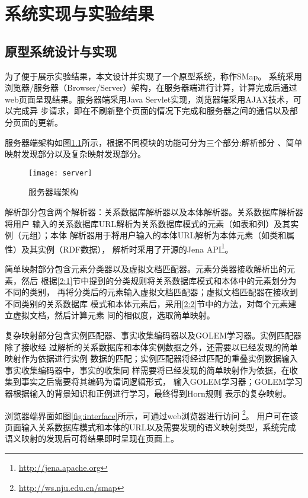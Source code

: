 \chapter{系统实现与实验结果}
\label{chap04}

\section{原型系统设计与实现}
为了便于展示实验结果，本文设计并实现了一个原型系统，称作SMap。
系统采用浏览器/服务器（Browser/Server）架构，在服务器端进行计算，计算完成后通过
web页面呈现结果。服务器端采用Java Servlet实现，浏览器端采用AJAX技术，可以完成异
步请求，即在不刷新整个页面的情况下完成和服务器之间的通信以及部分页面的更新。

服务器端架构如图\ref{fig:server}所示，根据不同模块的功能可分为三个部分:解析部分
、简单映射发现部分以及复杂映射发现部分。

\begin{figure}[htbp]
\centerline{\texttt{[image: server]}}
\caption{服务器端架构}
\label{fig:server}
\end{figure}

解析部分包含两个解析器：关系数据库解析器以及本体解析器。关系数据库解析器将用户
输入的关系数据库URL解析为关系数据库模式的元素（如表和列）及其实例（元组）；本体
解析器用于将用户输入的本体URL解析为本体元素（如类和属性）及其实例（RDF数据），
解析时采用了开源的Jena API\footnote{\url{http://jena.apache.org}}。

简单映射部分包含元素分类器以及虚拟文档匹配器。元素分类器接收解析出的元素，然后
根据\ref{2:1}节中提到的分类规则将关系数据库模式和本体中的元素划分为不同的类别，
再将分类后的元素输入虚拟文档匹配器；虚拟文档匹配器在接收到不同类别的关系数据库
模式和本体元素后，采用\ref{2:2}节中的方法，对每个元素建立虚拟文档，然后计算元素
间的相似度，选取简单映射。

复杂映射部分包含实例匹配器、事实收集编码器以及GOLEM学习器。实例匹配器除了接收经
过解析的关系数据库和本体实例数据之外，还需要以已经发现的简单映射作为依据进行实例
数据的匹配；实例匹配器将经过匹配的重叠实例数据输入事实收集编码器中，事实的收集同
样需要将已经发现的简单映射作为依据，在收集到事实之后需要将其编码为谓词逻辑形式，
输入GOLEM学习器；GOLEM学习器根据输入的背景知识和正例进行学习，最终得到Horn规则
表示的复杂映射。

浏览器端界面如图\ref{fig:interface}所示，可通过web浏览器进行访问
\footnote{\url{http://ws.nju.edu.cn/smap}}。
用户可在该页面输入关系数据库模式和本体的URL以及需要发现的语义映射类型，系统完成
语义映射的发现后可将结果即时呈现在页面上。

